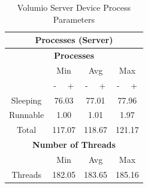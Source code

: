 \documentclass[11pt,a4paper,headinclude=false,footinclude=false]{scrreprt}
\begin{document}
\begin{table}[H]
\centering
    \begin{tabular}{||c|c|c|c|c|c|c||}
    \hline
    \multicolumn{7}{|c|}{\textbf{Processes (Server)}} \\
    \hline
    \multicolumn{7}{|c|}{\textbf{Processes}} \\
    \hline\hline
      & \multicolumn{2}{|c|}{Min} & \multicolumn{2}{|c|}{Avg} & \multicolumn{2}{|c|}{Max} \\
    \hline
      & - & + & - & + & - & + \\
    \hline
    Sleeping & \multicolumn{2}{|c|}{76.03} & \multicolumn{2}{|c|}{77.01} & \multicolumn{2}{|c|}{77.96} \\
    \hline
    Runnable & \multicolumn{2}{|c|}{1.00} & \multicolumn{2}{|c|}{1.01} & \multicolumn{2}{|c|}{1.97} \\
    \hline
    Total & \multicolumn{2}{|c|}{117.07} & \multicolumn{2}{|c|}{118.67} & \multicolumn{2}{|c|}{121.17} \\
    \hline\hline
    \multicolumn{7}{|c|}{\textbf{Number of Threads}} \\
    \hline\hline
      & \multicolumn{2}{|c|}{Min} & \multicolumn{2}{|c|}{Avg} & \multicolumn{2}{|c|}{Max} \\
    \hline
    Threads  & \multicolumn{2}{|c|}{182.05} & \multicolumn{2}{|c|}{183.65} & \multicolumn{2}{|c|}{185.16} \\
    \hline\hline
    \end{tabular}
    \caption{Volumio Server Device Process Parameters}
    \label{VolumioserverProcessTab}
\end{table}
\end{document}
